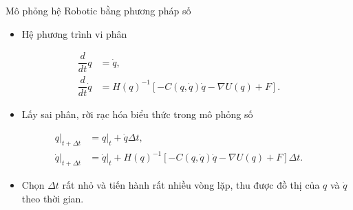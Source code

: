 \begin{frame}{Mô phỏng hệ Robotic bằng phương pháp số}
    \begin{itemize}
        \item Hệ phương trình vi phân
    \end{itemize}
    \begin{align}
        \dfrac{d}{dt} q &= \dot{q}, \\
        \dfrac{d}{dt} \dot{q} &= H(q)^{-1} \left[ - C(q,\dot{q}) \dot{q} -\nabla U(q) + F \right].
    \end{align}
    \vspace{-5mm}
    \begin{itemize}
        \item Lấy sai phân, rời rạc hóa biểu thức trong mô phỏng số
    \end{itemize}
    \begin{align}
        q|_{t+\Delta t} &= q|_{t} + \dot{q} \Delta t, \\
        \dot{q}|_{t+\Delta t} &= \dot{q}|_t + H(q)^{-1} \left[ - C(q,\dot{q}) \dot{q} -\nabla U(q) + F \right] \Delta t.
    \end{align}
    \vspace{-5mm}
    \begin{itemize}
        \item Chọn \(\Delta t\) rất nhỏ và tiến hành rất nhiều vòng lặp, thu được đồ thị của \(q\) và \(\dot{q}\) theo thời gian.
    \end{itemize}
\end{frame}